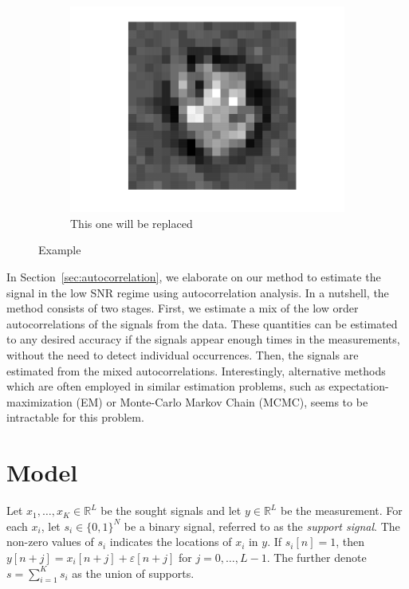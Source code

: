 \documentclass[english]{article}
\numberwithin{equation}{section}
\theoremstyle{plain}
\theoremstyle{definition}
\theoremstyle{remark}
\theoremstyle{plain}
\theoremstyle{remark}
\theoremstyle{plain}
\theoremstyle{plain}
\newcommand{\RL}{\mathbb{R}^L}
\newcommand{\RN}{\mathbb{R}^L}
\newcommand{\SNR}{\textsf{SNR} }
\begin{document}
\begin{figure}[ht!]
\begin{subfigure}{.5\textwidth}
	\centering
	\includegraphics[scale=0.5]{signal2D_RRR}
	\caption{This one will be replaced}
	\label{fig:signal2D_RRR}
\end{subfigure}

\caption{Example}
\label{fig:example}
\end{figure}

In Section~\ref{sec:autocorrelation}, we elaborate on our method to
estimate the signal in the low \SNR regime using autocorrelation analysis. In a nutshell,
the method consists of two stages. First, we estimate a mix of the low order autocorrelations of the signals from the data. These quantities can
be estimated to any desired accuracy if the signals appear enough times in the measurements, without the need to detect individual occurrences. Then, the signals are estimated from the mixed autocorrelations. Interestingly, alternative methods which are often employed in similar estimation problems, such as expectation-maximization (EM) or Monte-Carlo Markov Chain (MCMC), seems to be intractable for this problem. 


\section{Model}  \label{sec:model}

Let $x_1,\ldots,x_K\in\RL$ be the sought signals and let $y\in\RN$ be the measurement. For each $x_i$, let $s_i\in\{0,1\}^N$ be a binary signal, referred to as the \emph{support signal}. The non-zero values of $s_i$ indicates the locations of $x_i$ in $y$. If $s_i[n]=1$, then $y[n+j] = x_i[n+j]+\varepsilon[n+j]$ for $j=0,\ldots,L-1$. The further denote $s = \sum_{i=1}^Ks_i$ as the union of supports. 
\end{document}
